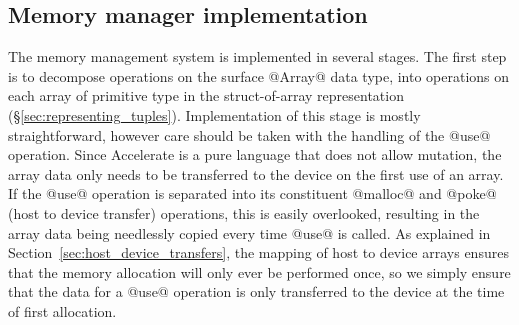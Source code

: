 \subsection{Memory manager implementation}
\label{sec:memory_manager_implementation}


%
%
%


The memory management system is implemented in several stages. The first step is
to decompose operations on the surface @Array@ data type, into operations on
each array of primitive type in the struct-of-array representation
(\S\ref{sec:representing_tuples}).
%
Implementation of this stage is mostly straightforward, however care should be
taken with the handling of the @use@ operation. Since Accelerate is a pure
language that does not allow mutation, the array data only needs to be
transferred to the device on the first use of an array. If the @use@ operation
is separated into its constituent @malloc@ and @poke@ (host to device transfer)
operations, this is easily overlooked, resulting in the array data being
needlessly copied every time @use@ is called. As explained in
Section~\ref{sec:host_device_transfers}, the mapping of host to device arrays
ensures that the memory allocation will only ever be performed once, so we
simply ensure that the data for a @use@ operation is only transferred to the
device at the time of first allocation.

